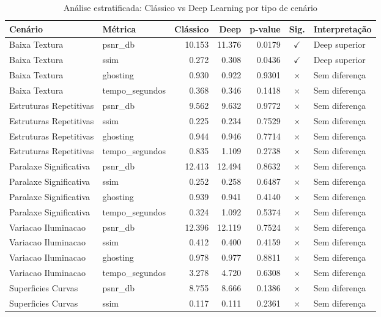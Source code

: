 \begin{table}[htb]
\centering
\caption{Análise estratificada: Clássico vs Deep Learning por tipo de cenário}
\label{tab:estratificado}
\tiny
\begin{tabular}{llrrrcp{3cm}}
\hline
\textbf{Cenário} & \textbf{Métrica} & \textbf{Clássico} & \textbf{Deep} & \textbf{p-value} & \textbf{Sig.} & \textbf{Interpretação} \\ \hline
Baixa Textura & psnr_db & 10.153 & 11.376 & 0.0179 & $\checkmark$ & Deep superior \\
Baixa Textura & ssim & 0.272 & 0.308 & 0.0436 & $\checkmark$ & Deep superior \\
Baixa Textura & ghosting & 0.930 & 0.922 & 0.9301 & $\times$ & Sem diferença \\
Baixa Textura & tempo_segundos & 0.368 & 0.346 & 0.1418 & $\times$ & Sem diferença \\
Estruturas Repetitivas & psnr_db & 9.562 & 9.632 & 0.9772 & $\times$ & Sem diferença \\
Estruturas Repetitivas & ssim & 0.225 & 0.234 & 0.7529 & $\times$ & Sem diferença \\
Estruturas Repetitivas & ghosting & 0.944 & 0.946 & 0.7714 & $\times$ & Sem diferença \\
Estruturas Repetitivas & tempo_segundos & 0.835 & 1.109 & 0.2738 & $\times$ & Sem diferença \\
Paralaxe Significativa & psnr_db & 12.413 & 12.494 & 0.8632 & $\times$ & Sem diferença \\
Paralaxe Significativa & ssim & 0.252 & 0.258 & 0.6487 & $\times$ & Sem diferença \\
Paralaxe Significativa & ghosting & 0.939 & 0.941 & 0.4140 & $\times$ & Sem diferença \\
Paralaxe Significativa & tempo_segundos & 0.324 & 1.092 & 0.5374 & $\times$ & Sem diferença \\
Variacao Iluminacao & psnr_db & 12.396 & 12.119 & 0.7524 & $\times$ & Sem diferença \\
Variacao Iluminacao & ssim & 0.412 & 0.400 & 0.4159 & $\times$ & Sem diferença \\
Variacao Iluminacao & ghosting & 0.978 & 0.977 & 0.8811 & $\times$ & Sem diferença \\
Variacao Iluminacao & tempo_segundos & 3.278 & 4.720 & 0.6308 & $\times$ & Sem diferença \\
Superficies Curvas & psnr_db & 8.755 & 8.666 & 0.1386 & $\times$ & Sem diferença \\
Superficies Curvas & ssim & 0.117 & 0.111 & 0.2361 & $\times$ & Sem diferença \\

\end{tabular}
\end{table}
